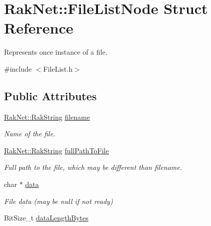 \hypertarget{struct_rak_net_1_1_file_list_node}{\section{Rak\-Net\-:\-:File\-List\-Node Struct Reference}
\label{struct_rak_net_1_1_file_list_node}
}


Represents once instance of a file.  




{\ttfamily \#include $<$File\-List.\-h$>$}

\subsection*{Public Attributes}
\begin{DoxyCompactItemize}
\item 
\hypertarget{struct_rak_net_1_1_file_list_node_ae4b5eb8be3568977c96dd6dc67ecb8b8}{\hyperlink{class_rak_net_1_1_rak_string}{Rak\-Net\-::\-Rak\-String} \hyperlink{struct_rak_net_1_1_file_list_node_ae4b5eb8be3568977c96dd6dc67ecb8b8}{filename}}\label{struct_rak_net_1_1_file_list_node_ae4b5eb8be3568977c96dd6dc67ecb8b8}

\begin{DoxyCompactList}\small\item\em Name of the file. \end{DoxyCompactList}\item 
\hypertarget{struct_rak_net_1_1_file_list_node_a36ee27443bd4be041163daeaa87cb635}{\hyperlink{class_rak_net_1_1_rak_string}{Rak\-Net\-::\-Rak\-String} \hyperlink{struct_rak_net_1_1_file_list_node_a36ee27443bd4be041163daeaa87cb635}{full\-Path\-To\-File}}\label{struct_rak_net_1_1_file_list_node_a36ee27443bd4be041163daeaa87cb635}

\begin{DoxyCompactList}\small\item\em Full path to the file, which may be different than filename. \end{DoxyCompactList}\item 
\hypertarget{struct_rak_net_1_1_file_list_node_ade7a1978f2aa5bf89961b1ad3bf5049f}{char $\ast$ \hyperlink{struct_rak_net_1_1_file_list_node_ade7a1978f2aa5bf89961b1ad3bf5049f}{data}}\label{struct_rak_net_1_1_file_list_node_ade7a1978f2aa5bf89961b1ad3bf5049f}

\begin{DoxyCompactList}\small\item\em File data (may be null if not ready) \end{DoxyCompactList}\item 
\hypertarget{struct_rak_net_1_1_file_list_node_a487ee977967c5e19dd2dfafcf150b9fc}{Bit\-Size\-\_\-t \hyperlink{struct_rak_net_1_1_file_list_node_a487ee977967c5e19dd2dfafcf150b9fc}{data\-Length\-Bytes}}\label{struct_rak_net_1_1_file_list_node_a487ee977967c5e19dd2dfafcf150b9fc}


\end{DoxyCompactItemize}
